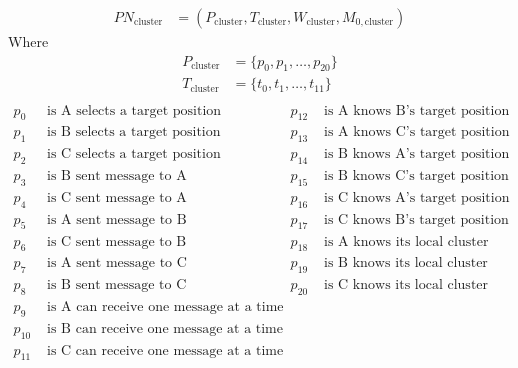 \documentclass[12pt,a4paper]{article}
\begin{document}
\begin{align*}
    PN_{\text{cluster}} &= (P_{\text{cluster}}, T_{\text{cluster}}, W_{\text{cluster}}, M_{0, \text{cluster}})
\end{align*}
Where
\begin{align*}
    P_{\text{cluster}} &= \{p_0, p_1, \ldots, p_{20}\} \\
    T_{\text{cluster}} &= \{t_0, t_1, \ldots, t_{11}\} \\
\end{align*}
\begin{align*}
    p_0  &\text{ is A selects a target position}              & p_{12} &\text{ is A knows B's target position} \\
    p_1  &\text{ is B selects a target position}              & p_{13} &\text{ is A knows C's target position} \\
    p_2  &\text{ is C selects a target position}              & p_{14} &\text{ is B knows A's target position} \\
    p_3  &\text{ is B sent message to A}                     & p_{15} &\text{ is B knows C's target position} \\
    p_4  &\text{ is C sent message to A}                     & p_{16} &\text{ is C knows A's target position} \\
    p_5  &\text{ is A sent message to B}                     & p_{17} &\text{ is C knows B's target position} \\
    p_6  &\text{ is C sent message to B}                     & p_{18} &\text{ is A knows its local cluster} \\
    p_7  &\text{ is A sent message to C}                     & p_{19} &\text{ is B knows its local cluster} \\
    p_8  &\text{ is B sent message to C}                     & p_{20} &\text{ is C knows its local cluster} \\
    p_9  &\text{ is A can receive one message at a time}      &        & \\
    p_{10}&\text{ is B can receive one message at a time}     &        & \\
    p_{11} &\text{ is C can receive one message at a time}    &        & \\
\end{align*}
\end{document}
